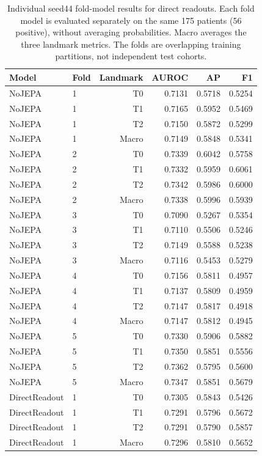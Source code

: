 \begin{table}[t]
\centering
\small
\caption{Individual seed44 fold-model results for direct readouts. Each fold model is evaluated separately on the same 175 patients (56 positive), without averaging probabilities. Macro averages the three landmark metrics. The folds are overlapping training partitions, not independent test cohorts.}
\label{tab:foldresults}
\begin{tabular}{llrrrr}
\toprule
Model & Fold & Landmark & AUROC & AP & F1 \\
\midrule
NoJEPA & 1 & T0 & 0.7131 & 0.5718 & 0.5254 \\
NoJEPA & 1 & T1 & 0.7165 & 0.5952 & 0.5469 \\
NoJEPA & 1 & T2 & 0.7150 & 0.5872 & 0.5299 \\
NoJEPA & 1 & Macro & 0.7149 & 0.5848 & 0.5341 \\
NoJEPA & 2 & T0 & 0.7339 & 0.6042 & 0.5758 \\
NoJEPA & 2 & T1 & 0.7332 & 0.5959 & 0.6061 \\
NoJEPA & 2 & T2 & 0.7342 & 0.5986 & 0.6000 \\
NoJEPA & 2 & Macro & 0.7338 & 0.5996 & 0.5939 \\
NoJEPA & 3 & T0 & 0.7090 & 0.5267 & 0.5354 \\
NoJEPA & 3 & T1 & 0.7110 & 0.5506 & 0.5246 \\
NoJEPA & 3 & T2 & 0.7149 & 0.5588 & 0.5238 \\
NoJEPA & 3 & Macro & 0.7116 & 0.5453 & 0.5279 \\
NoJEPA & 4 & T0 & 0.7156 & 0.5811 & 0.4957 \\
NoJEPA & 4 & T1 & 0.7137 & 0.5809 & 0.4959 \\
NoJEPA & 4 & T2 & 0.7147 & 0.5817 & 0.4918 \\
NoJEPA & 4 & Macro & 0.7147 & 0.5812 & 0.4945 \\
NoJEPA & 5 & T0 & 0.7330 & 0.5906 & 0.5882 \\
NoJEPA & 5 & T1 & 0.7350 & 0.5851 & 0.5556 \\
NoJEPA & 5 & T2 & 0.7362 & 0.5795 & 0.5600 \\
NoJEPA & 5 & Macro & 0.7347 & 0.5851 & 0.5679 \\
DirectReadout & 1 & T0 & 0.7305 & 0.5843 & 0.5426 \\
DirectReadout & 1 & T1 & 0.7291 & 0.5796 & 0.5672 \\
DirectReadout & 1 & T2 & 0.7291 & 0.5790 & 0.5857 \\
DirectReadout & 1 & Macro & 0.7296 & 0.5810 & 0.5652 \\

\end{tabular}
\end{table}
